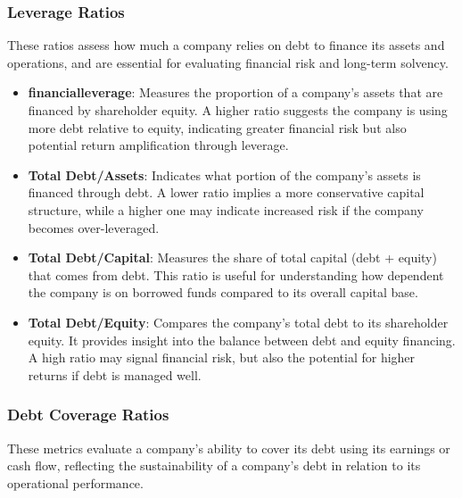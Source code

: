 \documentclass[11pt,english,a4paper,hidelinks]{book}
\begin{document}
\subsubsection{Leverage Ratios}
These ratios assess how much a company relies on debt to finance its assets and operations, and are essential for evaluating financial risk and long-term solvency.
\begin{itemize}
    \item \textbf{\acrshort{financialleverage}}: Measures the proportion of a company's assets that are financed by shareholder equity. A higher ratio suggests the company is using more debt relative to equity, indicating greater financial risk but also potential return amplification through leverage.
    
    \item \textbf{Total Debt/Assets}: Indicates what portion of the company's assets is financed through debt. A lower ratio implies a more conservative capital structure, while a higher one may indicate increased risk if the company becomes over-leveraged.
    
    \item \textbf{Total Debt/Capital}: Measures the share of total capital (debt + equity) that comes from debt. This ratio is useful for understanding how dependent the company is on borrowed funds compared to its overall capital base.
    
    \item \textbf{Total Debt/Equity}: Compares the company's total debt to its shareholder equity. It provides insight into the balance between debt and equity financing. A high ratio may signal financial risk, but also the potential for higher returns if debt is managed well.
\end{itemize}

\subsubsection{Debt Coverage Ratios}
These metrics evaluate a company's ability to cover its debt using its earnings or cash flow, reflecting the sustainability of a company's debt in relation to its operational performance.
\end{document}
